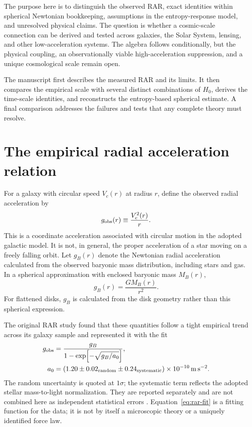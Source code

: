 \documentclass[12pt]{article}
\begin{document}
The purpose here is to distinguish the observed RAR, exact identities within spherical Newtonian bookkeeping, assumptions in the entropy-response model, and unresolved physical claims. The question is whether a cosmic-scale connection can be derived and tested across galaxies, the Solar System, lensing, and other low-acceleration systems. The algebra follows conditionally, but the physical coupling, an observationally viable high-acceleration suppression, and a unique cosmological scale remain open.

The manuscript first describes the measured RAR and its limits. It then compares the empirical scale with several distinct combinations of $H_0$, derives the time-scale identities, and reconstructs the entropy-based spherical estimate. A final comparison addresses the failures and tests that any complete theory must resolve.

\section{The empirical radial acceleration relation}
\label{sec:rar}

For a galaxy with circular speed $V_c(r)$ at radius $r$, define the observed radial acceleration by
\begin{equation}
  g_{\rm obs}(r)\equiv\frac{V_c^2(r)}{r}.
  \label{eq:g-observed}
\end{equation}
This is a coordinate acceleration associated with circular motion in the adopted galactic model. It is not, in general, the proper acceleration of a star moving on a freely falling orbit. Let $g_B(r)$ denote the Newtonian radial acceleration calculated from the observed baryonic mass distribution, including stars and gas. In a spherical approximation with enclosed baryonic mass $M_B(r)$,
\begin{equation}
  g_B(r)=\frac{G M_B(r)}{r^2}.
  \label{eq:g-baryon}
\end{equation}
For flattened disks, $g_B$ is calculated from the disk geometry rather than this spherical expression.

The original RAR study found that these quantities follow a tight empirical trend across its galaxy sample and represented it with the fit
\begin{equation}
  \begin{aligned}
    g_{\rm obs}
    &=\frac{g_B}{1-\exp\!\left[-\sqrt{g_B/a_0}\right]},\\
    a_0&=(1.20\pm0.02_{\rm random}\pm0.24_{\rm systematic})
      \times10^{-10}\,\mathrm{m\,s^{-2}}.
  \end{aligned}
  \label{eq:rar-fit}
\end{equation}
The random uncertainty is quoted at $1\sigma$; the systematic term reflects the adopted stellar mass-to-light normalization. They are reported separately and are not combined here as independent statistical errors \cite{McGaughRAR}. Equation~\eqref{eq:rar-fit} is a fitting function for the data; it is not by itself a microscopic theory or a uniquely identified force law.
\end{document}
